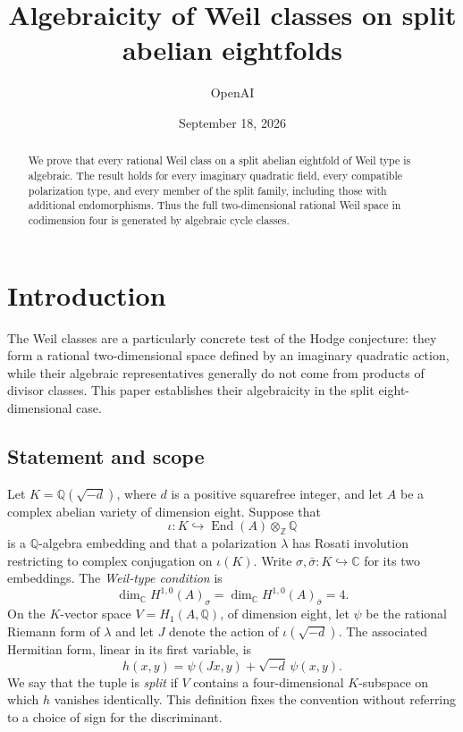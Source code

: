 \documentclass[11pt]{article}
\title{Algebraicity of Weil classes on split abelian eightfolds}
\author{OpenAI}
\date{September 18, 2026}
\theoremstyle{definition}
\theoremstyle{remark}
\numberwithin{equation}{section}
\begin{document}
\begin{abstract}
We prove that every rational Weil class on a split abelian eightfold of
Weil type is algebraic. The result holds for every imaginary quadratic
field, every compatible polarization type, and every member of the split
family, including those with additional endomorphisms. Thus the full
two-dimensional rational Weil space in codimension four is generated by
algebraic cycle classes.
\end{abstract}
\tableofcontents
\section{Introduction}
\label{intro:section}

The Weil classes are a particularly concrete test of the Hodge conjecture:
they form a rational two-dimensional space defined by an imaginary
quadratic action, while their algebraic representatives generally do not
come from products of divisor classes.  This paper establishes their
algebraicity in the split eight-dimensional case.

\subsection{Statement and scope}

Let $K=\mathbb Q(\sqrt{-d})$, where $d$ is a positive squarefree integer, and let
$A$ be a complex abelian variety of dimension eight.  Suppose that
\[
 \iota:K\hookrightarrow\operatorname{End}(A)\otimes_\mathbb Z\mathbb Q
\]
is a $\mathbb Q$-algebra embedding and that a polarization $\lambda$ has Rosati
involution restricting to complex conjugation on $\iota(K)$.  Write
$\sigma,\bar\sigma:K\hookrightarrow\mathbb C$ for its two embeddings.
The \emph{Weil-type condition} is
\[
 \dim_\mathbb C H^{1,0}(A)_\sigma=
 \dim_\mathbb C H^{1,0}(A)_{\bar\sigma}=4.
\]
On the $K$-vector space $V=H_1(A,\mathbb Q)$, of dimension eight, let $\psi$
be the rational Riemann form of $\lambda$ and let $J$ denote the action
of $\iota(\sqrt{-d})$.  The associated Hermitian form, linear in its first
variable, is
\begin{equation}
 h(x,y)=\psi(Jx,y)+\sqrt{-d}\,\psi(x,y).
 \label{intro:hermitian}
\end{equation}
We say that the tuple is \emph{split} if $V$ contains a four-dimensional
$K$-subspace on which $h$ vanishes identically.  This definition fixes the
convention without referring to a choice of sign for the discriminant.
\end{document}
